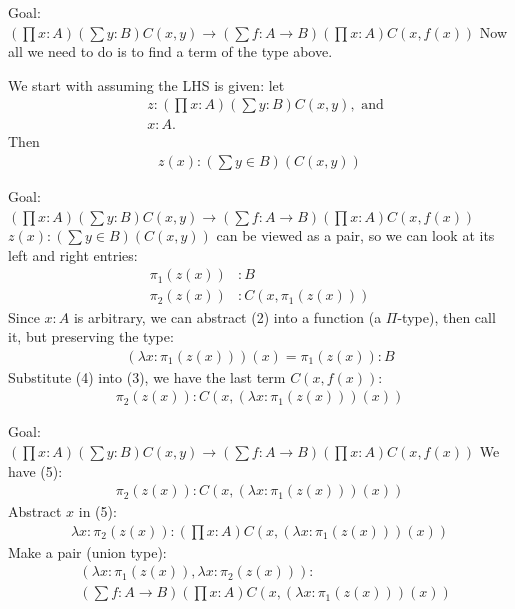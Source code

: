 \documentclass{beamer}
\theoremstyle{plain}
\begin{document}
\begin{frame}{Goal: $(\prod x: A)(\sum {y: B})C(x, y)\to(\sum{f: A\to B})(\prod{x: A})C(x, f(x))$}
    Now all we need to do is to find a term of the type above.

    We start with assuming the LHS is given: let
    \begin{align*}
    &z:(\prod x: A)(\sum {y: B})C(x, y),\text{ and}\\
    &x:A.
    \end{align*}
    Then
    \begin{align}
    z(x): (\sum y\in B)(C(x, y))
    \end{align}
\end{frame}

\begin{frame}{Goal: $(\prod x: A)(\sum {y: B})C(x, y)\to(\sum{f: A\to B})(\prod{x: A})C(x, f(x))$}
  $z(x): (\sum y\in B)(C(x, y))$ can be viewed as a pair, so we can look at its left
  and right entries:
    \begin{align}
    \pi_{1}(z(x))&: B\\
    \pi_{2}(z(x))&:C(x, \pi_{1}(z(x)))
    \end{align}
    Since $x: A$ is arbitrary, we can abstract (2) into a function (a $\Pi$-type),
    then call it, but preserving the type:
    \begin{align}
    (\lambda x:\pi_{1}(z(x)))(x) = \pi_{1}(z(x)): B
    \end{align}
    Substitute (4) into (3), we have the last term $C(x, f(x))$:
    \begin{align}
    \pi_{2}(z(x)):C(x, (\lambda x:\pi_{1}(z(x)))(x))
    \end{align}
\end{frame}

\begin{frame}{Goal: $(\prod x: A)(\sum {y: B})C(x, y)\to(\sum{f: A\to B})(\prod{x: A})C(x, f(x))$}
  We have (5):
  \begin{align*}
    \pi_{2}(z(x)):C(x, (\lambda x:\pi_{1}(z(x)))(x))
  \end{align*}
    Abstract $x$ in (5):
    \begin{align}
    \lambda x:\pi_{2}(z(x)):(\prod x:A)C(x, (\lambda x:\pi_{1}(z(x)))(x))
    \end{align}
    Make a pair (union type):
      \begin{align}
        &(\lambda x: \pi_{1}(z(x)), \lambda x:\pi_{2}(z(x))):\nonumber\\
        &(\sum f:A\to B)(\prod x:A)C(x, (\lambda x:\pi_{1}(z(x)))(x))
      \end{align}
\end{frame}
\end{document}
